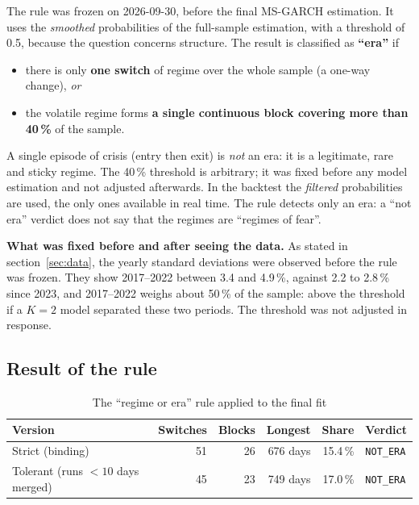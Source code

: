 \documentclass[12pt,a4paper]{article}
\begin{document}
The rule was frozen on 2026-09-30, before the final MS-GARCH estimation. It uses the \emph{smoothed} probabilities of the full-sample estimation, with a threshold of 0.5, because the question concerns structure. The result is classified as \textbf{``era''} if
\begin{itemize}
	\item there is only \textbf{one switch} of regime over the whole sample (a one-way change), \emph{or}
	\item the volatile regime forms \textbf{a single continuous block covering more than 40\,\%} of the sample.
\end{itemize}
A single episode of crisis (entry then exit) is \emph{not} an era: it is a legitimate, rare and sticky regime. The 40\,\% threshold is arbitrary; it was fixed before any model estimation and not adjusted afterwards. In the backtest the \emph{filtered} probabilities are used, the only ones available in real time. The rule detects only an era: a ``not era'' verdict does not say that the regimes are ``regimes of fear''.

\begin{limitbox}
	\textbf{What was fixed before and after seeing the data.} As stated in section~\ref{sec:data}, the yearly standard deviations were observed before the rule was frozen. They show 2017--2022 between 3.4 and 4.9\,\%, against 2.2 to 2.8\,\% since 2023, and 2017--2022 weighs about 50\,\% of the sample: above the threshold if a $K=2$ model separated these two periods. The threshold was not adjusted in response.
\end{limitbox}

\subsection{Result of the rule}

\begin{table}[H]
	\centering
	\caption{The ``regime or era'' rule applied to the final fit}
	\label{tab:era-rule}
	\small
	\begin{tabular}{p{3.6cm}rrrrl}
		\toprule
		Version & Switches & Blocks & Longest & Share & Verdict \\
		\midrule
		Strict (binding) & 51 & 26 & 676 days & 15.4\,\% & \texttt{NOT\_\allowbreak{}ERA} \\
		Tolerant (runs $<10$ days merged) & 45 & 23 & 749 days & 17.0\,\% & \texttt{NOT\_\allowbreak{}ERA} \\
		\bottomrule
	\end{tabular}
\end{table}
\end{document}
